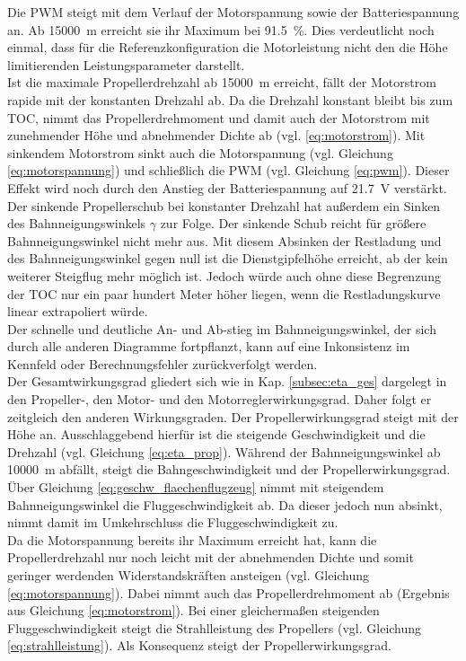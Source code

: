 Die PWM steigt mit dem Verlauf der Motorspannung sowie der Batteriespannung an. Ab \SI{15000}{m} erreicht sie ihr Maximum bei \SI{91,5}{\%}. Dies verdeutlicht noch einmal, dass für die Referenzkonfiguration die Motorleistung nicht den die Höhe limitierenden Leistungsparameter darstellt. \\
Ist die maximale Propellerdrehzahl ab \SI{15000}{m} erreicht, fällt der Motorstrom rapide mit der konstanten Drehzahl ab. Da die Drehzahl konstant bleibt bis zum TOC, nimmt das Propellerdrehmoment und damit auch der Motorstrom mit zunehmender Höhe und abnehmender Dichte ab (vgl. \eqref{eq:motorstrom}). Mit sinkendem Motorstrom sinkt auch die Motorspannung  (vgl. Gleichung \eqref{eq:motorspannung}) und schließlich die PWM (vgl. Gleichung \eqref{eq:pwm}). Dieser Effekt wird noch durch den Anstieg der Batteriespannung auf \SI{21.7}{V} verstärkt. Der sinkende Propellerschub bei konstanter Drehzahl hat außerdem ein Sinken des Bahnneigungswinkels \ensuremath{\gamma} zur Folge. Der sinkende Schub reicht für größere Bahnneigungswinkel nicht mehr aus. Mit diesem Absinken der Restladung und des Bahnneigungswinkel gegen null ist die Dienstgipfelhöhe erreicht, ab der kein weiterer Steigflug mehr möglich ist. Jedoch würde auch ohne diese Begrenzung der TOC nur ein paar hundert Meter höher liegen, wenn die Restladungskurve linear extrapoliert würde. \\
Der schnelle und deutliche An- und Ab-stieg im Bahnneigungswinkel, der sich durch alle anderen Diagramme fortpflanzt, kann auf eine Inkonsistenz im Kennfeld oder Berechnungsfehler zurückverfolgt werden.\\
Der Gesamtwirkungsgrad gliedert sich wie in Kap. \ref{subsec:eta_ges} dargelegt in den Propeller-, den Motor- und den Motorreglerwirkungsgrad. Daher folgt er zeitgleich den anderen Wirkungsgraden. Der Propellerwirkungsgrad steigt mit der Höhe an. Ausschlaggebend hierfür ist die steigende Geschwindigkeit und die Drehzahl (vgl. Gleichung \eqref{eq:eta_prop}). Während der Bahnneigungswinkel ab \SI{10000}{m} abfällt, steigt die Bahngeschwindigkeit und der Propellerwirkungsgrad. Über Gleichung \eqref{eq:geschw_flaechenflugzeug} nimmt mit steigendem Bahnneigungswinkel die Fluggeschwindigkeit ab. Da dieser jedoch nun absinkt, nimmt damit im Umkehrschluss die Fluggeschwindigkeit zu. \\
Da die Motorspannung bereits ihr Maximum erreicht hat, kann die Propellerdrehzahl nur noch leicht mit der abnehmenden Dichte und somit geringer werdenden Widerstandskräften ansteigen (vgl. Gleichung \eqref{eq:motorspannung}). Dabei nimmt auch das Propellerdrehmoment ab (Ergebnis aus Gleichung \eqref{eq:motorstrom}). Bei einer gleichermaßen steigenden Fluggeschwindigkeit steigt die Strahlleistung des Propellers (vgl. Gleichung \eqref{eq:strahlleistung}). Als Konsequenz steigt der Propellerwirkungsgrad.
